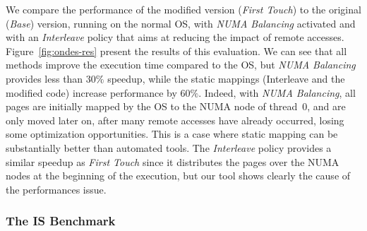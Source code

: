 We compare the performance of the modified version (\emph{First Touch}) to the original (\emph{Base}) version, running on the normal OS, with \emph{NUMA Balancing} activated and with an \emph{Interleave} policy that aims at reducing the impact of remote accesses.
Figure~\ref{fig:ondes-res} present the results of this evaluation.
We can see that all methods improve the execution time compared to the \gls{OS}, but \emph{NUMA Balancing} provides less than $30\%$ speedup, while the static mappings (Interleave and the modified code) increase performance by $60\%$.
Indeed, with \emph{NUMA Balancing}, all pages are initially mapped by the \gls{OS} to the \gls{NUMA} node of thread~$0$, and are only moved later on, after many remote accesses have already occurred, losing some optimization opportunities.
This is a case where static mapping can be substantially better than automated tools.
The \emph{Interleave} policy provides a similar speedup as \emph{First Touch} since it distributes the pages over the \gls{NUMA} nodes at the beginning of the execution, but our tool shows clearly the cause of the performances issue.

\subsubsection{The IS Benchmark}

